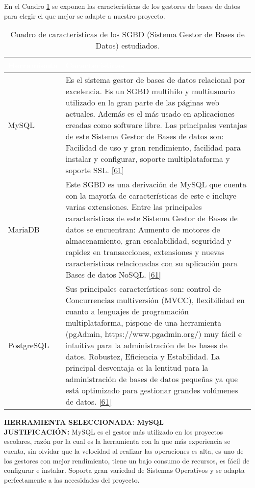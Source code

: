 \newpage

 En el Cuadro \ref{tbl:sgbd} se exponen las características de los gestores de bases de datos para elegir el que mejor se adapte a nuestro proyecto.

\begin{table}[H]
	\centering
	\begin{tabular}{|p{3cm}|p{12cm}|}
		\hline
		\rowcolor{black} \textcolor{white} {\textbf{Herramienta}} & \textcolor{white}{\textbf{Características}}  \\ \hline
		MySQL & Es el sistema gestor de bases de datos relacional por excelencia.
		Es un SGBD multihilo y multiusuario utilizado en la gran parte de las páginas web actuales. Además es el más usado en aplicaciones creadas como software libre. 
		Las principales ventajas de este Sistema Gestor de Bases de datos son: Facilidad de uso y gran rendimiento, facilidad para instalar y configurar, soporte multiplataforma y soporte SSL. \hyperlink{b61}{[61]}\\
		\hline
		MariaDB & Este SGBD es una derivación de MySQL que cuenta con la mayoría de características de este e incluye varias extensiones. Entre las principales características de este Sistema Gestor de Bases de datos se encuentran: Aumento de motores de almacenamiento, gran escalabilidad, seguridad y rapidez en transacciones, extensiones y nuevas características relacionadas con su aplicación para Bases de datos NoSQL. \hyperlink{b61}{[61]} \\
		\hline
		PostgreSQL & Sus principales características son: control de Concurrencias multiversión (MVCC), flexibilidad en cuanto a lenguajes de programación multiplataforma, pispone de una herramienta (pgAdmin, https://www.pgadmin.org/) muy fácil e intuitiva para la administración de las bases de datos. Robustez, Eficiencia y Estabilidad.
		La principal desventaja es la lentitud para la administración de bases de datos pequeñas ya que está optimizado para gestionar grandes volúmenes de datos. \hyperlink{b61}{[61]}\\
		\hline
	\end{tabular}
	\caption{Cuadro de características de los SGBD (Sistema Gestor de Bases de Datos) estudiados.}
	\label{tbl:sgbd}
\end{table}

\textbf {HERRAMIENTA SELECCIONADA: MySQL}\\

\textbf {JUSTIFICACIÓN:}
MySQL es el gestor más utilizado en los proyectos escolares, razón por la cual es la herramienta con la que más experiencia se cuenta, sin olvidar que la velocidad al realizar las operaciones es alta, es uno de los gestores con mejor rendimiento, tiene un bajo consumo de recursos, es fácil de configurar e instalar. Soporta gran variedad de Sistemas Operativos y se adapta perfectamente a las necesidades del proyecto.
\newpage
